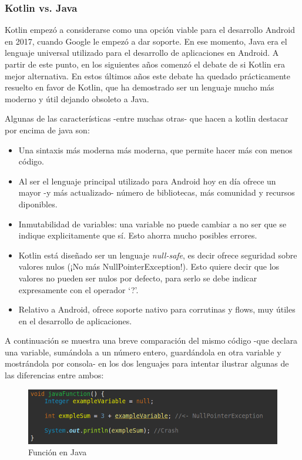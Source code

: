 \subsubsection{Kotlin vs. Java}
\label{subsec:kotlinvsjava}
Kotlin empezó a considerarse como una opción viable para el desarrollo Android en 2017, cuando Google le empezó a dar soporte. En ese momento, Java era el lenguaje universal utilizado para el desarrollo de aplicaciones en Android. A partir de este punto, en los siguientes años comenzó el debate de si Kotlin era mejor alternativa. En estos últimos años este debate ha quedado prácticamente resuelto en favor de Kotlin, que ha demostrado ser un lenguaje mucho más moderno y útil dejando obsoleto a Java.

Algunas de las características -entre muchas otras- que hacen a kotlin destacar por encima de java son:
\begin{itemize}
    \item Una sintaxis más moderna más moderna, que permite hacer más con menos código.
    \item Al ser el lenguaje principal utilizado para Android hoy en día ofrece un mayor -y más actualizado- número de bibliotecas, más comunidad y recursos diponibles.
    \item Inmutabilidad de variables: una variable no puede cambiar a no ser que se indique explicitamente que sí. Esto ahorra mucho posibles errores.
    \item Kotlin está diseñado ser un lenguaje \textit{null-safe}, es decir ofrece seguridad sobre valores nulos (¡No más NullPointerException!). Esto quiere decir que los valores no pueden ser nulos por defecto, para serlo se debe indicar expresamente con el operador ‘?’.
    \item Relativo a Android, ofrece soporte nativo para corrutinas y flows, muy útiles en el desarrollo de aplicaciones.
\end{itemize}
A continuación se muestra una breve comparación del mismo código -que declara una variable, sumándola a un número entero, guardándola en otra variable y mostrándola por consola- en los dos lenguajes para intentar ilustrar algunas de las diferencias entre ambos:
\begin{figure}[h]
	\centering
	\includegraphics[width = 1\textwidth]{Imagenes/Fuentes/javaFun.png}
	\caption{Función en Java}
	\label{fig:javaFun}
\end{figure}
